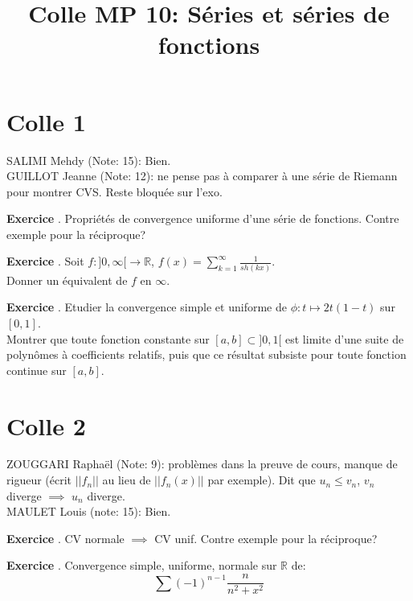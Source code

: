 \documentclass[10pt,a4paper]{article}
\title{Colle MP 10: Séries et séries de fonctions}
\newcounter{question}
\newcounter{exo}
\newenvironment{exo}{\vspace{0.5cm}\setcounter{question}{0}\addtocounter{exo}{1} \noindent \textbf{Exercice \theexo}. \normalsize }{\par}
\begin{document}
	\maketitle
	
	\section*{Colle 1}
	SALIMI Mehdy (Note: 15): Bien.\\
	GUILLOT Jeanne (Note: 12): ne pense pas à comparer à une série de Riemann pour montrer CVS. Reste bloquée sur l'exo.\\
	
	\begin{exo}
		Propriétés de convergence uniforme d'une série de fonctions. Contre exemple pour la réciproque?
	\end{exo}

	\begin{exo}
		Soit $f : ]0, \infty[ \longrightarrow \mathbb{R}$, $f(x) = \sum_{k=1}^{\infty}	\frac{1}{sh(kx)}$.\\
		Donner un équivalent de $f$ en $\infty$.
	\end{exo}

	\begin{exo}
		Etudier la convergence simple et uniforme de $\phi : t \longmapsto 2 t (1-t)$ sur $[0, 1]$.\\
		Montrer que toute fonction constante sur $[a, b] \subset ]0, 1[$ est limite d'une suite de polynômes à coefficients relatifs, puis que ce résultat subsiste pour toute fonction continue sur $[a, b]$.
	\end{exo}
	
	\section*{Colle 2}
	\setcounter{exo}{0}
	ZOUGGARI Raphaël (Note: 9): problèmes dans la preuve de cours, manque de rigueur (écrit $\vert \vert f_n \vert \vert$ au lieu de $\vert \vert f_n(x) \vert \vert$ par exemple). Dit que $u_n \leq v_n$, $v_n$ diverge $\implies$ $u_n$ diverge.\\
	MAULET Louis (note: 15): Bien.\\

	\begin{exo}
		CV normale $\implies$ CV unif. Contre exemple pour la réciproque?
	\end{exo}

	\begin{exo}
		Convergence simple, uniforme, normale sur $\mathbb{R}$ de:
		$$\sum (-1)^{n-1} \frac{n}{n^2 + x^2}$$
	\end{exo}
		
\end{document}
